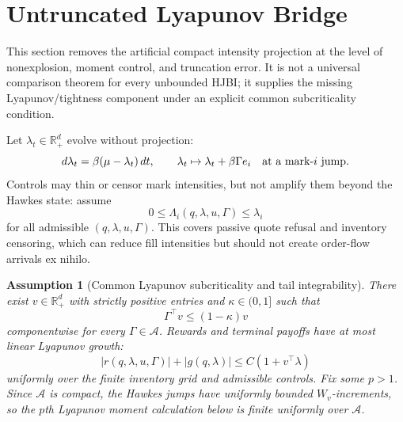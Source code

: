 \documentclass[11pt]{article}
\newtheorem{assumption}{Assumption}
\newcommand{\R}{\mathbb{R}}
\begin{document}
\section{Untruncated Lyapunov Bridge}

This section removes the artificial compact intensity projection at the level
of nonexplosion, moment control, and truncation error. It is not a universal
comparison theorem for every unbounded HJBI; it supplies the missing
Lyapunov/tightness component under an explicit common subcriticality condition.

Let $\lambda_t\in\R_+^d$ evolve without projection:
\[
d\lambda_t=\beta(\mu-\lambda_t)\,dt,
\qquad
\lambda_t\mapsto \lambda_t+\beta\Gamma e_i
\quad\hbox{at a mark-}i\hbox{ jump.}
\]
Controls may thin or censor mark intensities, but not amplify them beyond the
Hawkes state: assume
\[
0\le \Lambda_i(q,\lambda,u,\Gamma)\le \lambda_i
\]
for all admissible $(q,\lambda,u,\Gamma)$. This covers passive quote refusal
and inventory censoring, which can reduce fill intensities but should not
create order-flow arrivals ex nihilo.

\begin{assumption}[Common Lyapunov subcriticality and tail integrability]
There exist $v\in\R_+^d$ with strictly positive entries and $\kappa\in(0,1]$
such that
\[
\Gamma^\top v\le (1-\kappa)v
\]
componentwise for every $\Gamma\in\mathcal A$. Rewards and terminal payoffs
have at most linear Lyapunov growth:
\[
|r(q,\lambda,u,\Gamma)|+|g(q,\lambda)|\le C(1+v^\top\lambda)
\]
uniformly over the finite inventory grid and admissible controls. Fix some
$p>1$. Since $\mathcal A$ is compact, the Hawkes jumps have uniformly bounded
$W_v$-increments, so the $p$th Lyapunov moment calculation below is finite
uniformly over $\mathcal A$.
\end{assumption}
\end{document}
